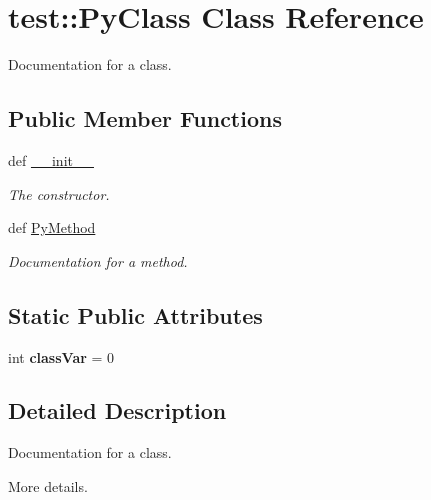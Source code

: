 \hypertarget{classtest_1_1PyClass}{\section{test\-:\-:\-Py\-Class \-Class \-Reference}
\label{classtest_1_1PyClass}
}


\-Documentation for a class.  


\subsection*{\-Public \-Member \-Functions}
\begin{DoxyCompactItemize}
\item 
def \hyperlink{classtest_1_1PyClass_a127c50607e2855774a13ba5092a27d87}{\-\_\-\-\_\-init\-\_\-\-\_\-}
\begin{DoxyCompactList}\small\item\em \-The constructor. \end{DoxyCompactList}\item 
def \hyperlink{classtest_1_1PyClass_af12ae9eb815b70933e73b63ee3783f2c}{\-Py\-Method}
\begin{DoxyCompactList}\small\item\em \-Documentation for a method. \end{DoxyCompactList}\end{DoxyCompactItemize}
\subsection*{\-Static \-Public \-Attributes}
\begin{DoxyCompactItemize}
\item 
\hypertarget{classtest_1_1PyClass_a5edc03a4329f5a933cee57cfaa74440a}{int {\bfseries class\-Var} = 0}\label{classtest_1_1PyClass_a5edc03a4329f5a933cee57cfaa74440a}

\end{DoxyCompactItemize}


\subsection{\-Detailed \-Description}
\-Documentation for a class. 

\-More details. 

